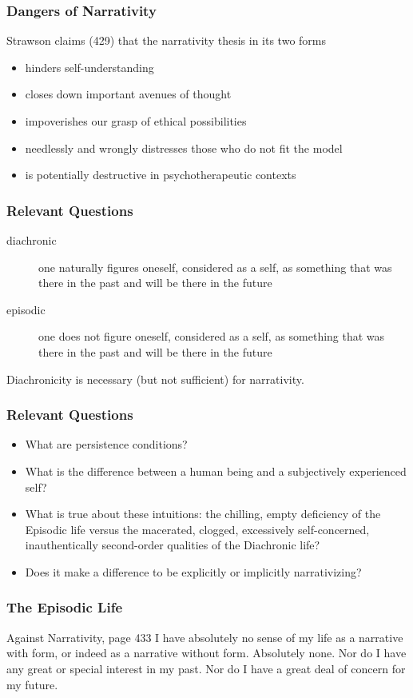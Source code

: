 \documentclass[xcolor=dvipsnames]{beamer}
\begin{document}
\begin{frame}
  \frametitle{Dangers of Narrativity}
  Strawson claims (429) that the narrativity thesis in its two forms
  \begin{itemize}
  \item hinders self-understanding
  \item closes down important avenues of thought
  \item impoverishes our grasp of ethical possibilities
  \item needlessly and wrongly distresses those who do not fit the
    model
  \item is potentially destructive in psychotherapeutic contexts
  \end{itemize}
\end{frame}

\begin{frame}
  \frametitle{Relevant Questions}
  \begin{description}
  \item[diachronic] one naturally figures oneself, considered as a
    self, as something that was there in the past and will be there in
    the future
  \item[episodic] one does not figure oneself, considered as a
    self, as something that was there in the past and will be there in
    the future
  \end{description}
  Diachronicity is necessary (but not sufficient) for narrativity.
\end{frame}

\begin{frame}
  \frametitle{Relevant Questions}
  \begin{itemize}
  \item What are persistence conditions?
  \item What is the difference between a human being and a subjectively
    experienced self?
  \item What is true about these intuitions: the chilling, empty
    deficiency of the Episodic life versus the macerated, clogged,
    excessively self-concerned, inauthentically second-order qualities
    of the Diachronic life?
  \item Does it make a difference to be explicitly or implicitly
    narrativizing?
  \end{itemize}
\end{frame}

\begin{frame}
  \frametitle{The Episodic Life}
  \begin{block}{Against Narrativity, page 433}
    I have absolutely no sense of my life as a narrative with form, or
    indeed as a narrative without form. Absolutely none. Nor do I have
    any great or special interest in my past. Nor do I have a great
    deal of concern for my future.
  \end{block}
\end{frame}
\end{document}
